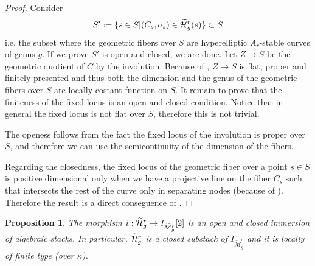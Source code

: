 \documentclass{alggeom}
\numberwithin{equation}{section}
\numberwithin{subsection}{section}
\newtheorem{proposition}[theorem]{Proposition}
\theoremstyle{definition}
\theoremstyle{remark}
\newcommand\arr{\ifinner\to\else\longrightarrow\fi}
\newcommand{\Mtilde}{\widetilde{\mathcal M}}
\newcommand{\Htilde}{\widetilde{\cH}}
\begin{document}
\begin{proof}
Consider $$S':=\{s\in S| (C_s,\sigma_s) \in \Htilde_g^r(s)  \}\subset S$$
i.e. the subset where the geometric fibers over $S$ are hyperelliptic $A_r$-stable curves of genus $g$. If we prove $S'$ is open and closed, we are done.
Let $Z\rightarrow S$ be the geometric quotient of $C$ by the involution. Because of , $Z\rightarrow S$ is flat, proper and finitely presented and thus both the dimension and the genus of the geometric fibers over $S$ are locally costant function on $S$. It remain to prove that the finiteness of the fixed locus is an open and closed condition. Notice that in general the fixed locus is not flat over $S$, therefore this is not trivial.

The openess follows from the fact the fixed locus of the involution is proper over $S$, and therefore we can use the semicontinuity of the dimension of the fibers. 
 
Regarding the closedness, the fixed locus of the geometric fiber over a point $s\in S$ is positive dimensional only when we have a projective line on the fiber $C_s$ such that intersects the rest of the curve only in separating nodes (because of ). Therefore the result is a direct conseguence of .
\end{proof}
 	
\begin{proposition}\label{prop:open-closed-imm}
	The morphism $i:\Htilde_g^r \arr \mathit{I}_{\Mtilde_g^r}[2]$ is an open and closed immersion of algebraic stacks. In particular, $\Htilde_g^r$ is a closed substack of $\mathit{I}_{\Mtilde_g^r}$ and it is locally of finite type (over $\kappa$). 
\end{proposition}
\end{document}
